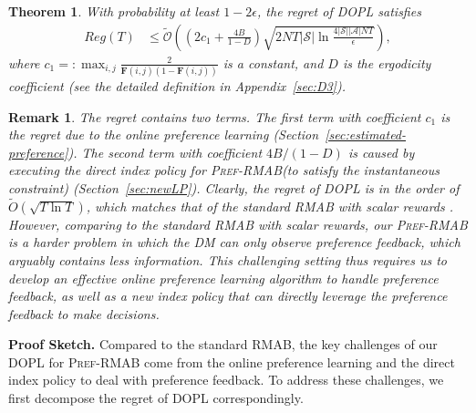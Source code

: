 \documentclass{article} %
\newcommand{\RMABPF}{\textsc{Pref-RMAB}\xspace}
\newcommand{\DOPL}{\textsc{DOPL}\xspace}
\newcommand{\bF}{\mathbf{F}}
\newcommand{\cA}{\mathcal{A}}
\newcommand{\cS}{\mathcal{S}}
\newtheorem{remark}{Remark}
\newtheorem{theorem}{Theorem}
\begin{document}
\begin{theorem}\label{thm:main}
With probability at least $1-2\epsilon$, the regret of \DOPL satisfies
\begin{align}
    Reg(T)&\leq \tilde{\mathcal{O}}\left(\left(2c_1+\frac{4B}{1-D}\right)\sqrt{2NT|\cS|\ln\frac{4|\cS||\cA|NT}{\epsilon}}\right),
\end{align}
where $c_1=:\max_{i,j}\frac{2}{\bF(i,j)(1-\bF(i,j))}$ is a constant, and $D$ is the ergodicity coefficient {(see the detailed definition in Appendix~\ref{sec:D3})}. 
\end{theorem}
\begin{remark}
The regret contains two terms. The first term with coefficient $c_1$ is the regret due to the online preference learning  (Section~\ref{sec:estimated-preference}). The second term with coefficient $4B/(1-D)$ is caused by executing the direct index policy for \RMABPF (to satisfy the instantaneous constraint) (Section~\ref{sec:newLP}). Clearly, the regret of \DOPL is in the order of $\tilde{O}(\sqrt{T\ln T})$, which matches that of the standard RMAB with scalar rewards \citep{ortner2012regret, wang2020restless,xiong2022reinforcement}. 
However, comparing to the standard RMAB with scalar rewards, our \RMABPF is a harder problem in which the DM can only observe preference feedback, which arguably contains less information. 
This challenging setting thus requires us to develop an effective online preference learning algorithm to handle preference feedback, as well as a new index policy that can directly leverage the preference feedback to make decisions. 
\end{remark}


\textbf{Proof Sketch.} Compared to the standard RMAB, the key challenges of our \DOPL for \RMABPF come from the online preference learning and the direct index policy to deal with preference feedback. To address these challenges, we first decompose the regret of \DOPL correspondingly. 
\end{document}
